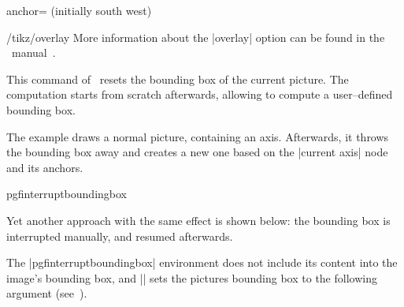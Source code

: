 \begin{pgfplotskey}{anchor= (initially south west)}
\begin{minipage}
\begin{tabular}
\begin{center}
\begin{key}{/tikz/overlay}
	More information about the |overlay| option can be found in the \PGF\ manual~\cite{tikz}.
\end{key}

\begin{command}{\pgfresetboundingbox}
	This command of \pgfname\ resets the bounding box of the current picture. The computation starts from scratch afterwards, allowing to compute a user--defined bounding box.
	
\begin{codeexample}[]
\setlength{\fboxsep}{0pt}%
%
\end{codeexample}%
	The example draws a normal picture, containing an axis. Afterwards, it throws the bounding box away and creates a new one based on the |current axis| node and its anchors.
\end{command}

\begin{environment}{{pgfinterruptboundingbox}}
\label{sec:bounding:box:example}%
{%
%
	Yet another approach with the same effect is shown below: the bounding box is interrupted manually, and resumed afterwards.
\begin{codeexample}[]
\setlength{\fboxsep}{0pt}%
%
\end{codeexample}%
}%
The |pgfinterruptboundingbox| environment does not include its content into the image's bounding box, and |\useasboundingbox| sets the pictures bounding box to the following argument (see~\cite{tikz}).
\end{environment}


\end{center}
\end{tabular}
\end{minipage}
\end{pgfplotskey}
